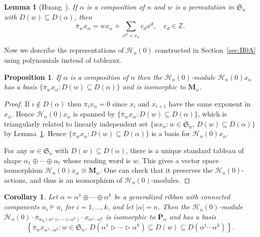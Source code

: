 \documentclass{amsart}
\newtheorem{lemma}[theorem]{Lemma}
\newtheorem{proposition}[theorem]{Proposition}
\newtheorem{corollary}[theorem]{Corollary}
\newtheorem*{Young's Rule}{Young's Rule}
\theoremstyle{definition}
\theoremstyle{remark}
\numberwithin{equation}{section}
\begin{document}
\begin{lemma}[Huang~\cite{H0CF}]\label{DemazureAtoms}
If $\alpha$ is a composition of $n$ and $w$ is a permutation in ${{\mathfrak S}}_n$ with $D(w)\subseteq D(\alpha)$, then
\[
\overline\pi_w x_{\alpha} =w x_{\alpha} +\sum_{x^d\prec x_{\alpha}}c_dx^d, \quad c_d\in{{\mathbb Z}}.
\]
\end{lemma}

Now we describe the representations of ${\mathcal{H}}_n(0)$ constructed in Section~\ref{sec:H0A} using polynomials instead of tableaux.

\begin{proposition}\label{prop:PolyM}
If $\alpha$ is a composition of $n$ then the ${\mathcal{H}}_n(0)$-module ${\mathcal{H}}_n(0) x_\alpha$ has a basis $\{ {\overline{\pi}}_w x_\alpha: D(w)\subseteq D(\alpha)\}$ and is isomorphic to ${\mathbf{M}}_\alpha$.
\end{proposition}

\begin{proof}
If $i\notin D(\alpha)$ then ${\overline{\pi}}_i x_\alpha=0$ since $x_i$ and $x_{i+1}$ have the same exponent in $x_\alpha$. Hence ${\mathcal{H}}_n(0) x_\alpha$ is spanned by $\{{\overline{\pi}}_w x_\alpha: D(w)\subseteq D(\alpha)\}$, which is triangularly related to linearly independent set $\{wx_\alpha: w\in{{\mathfrak S}}_n,\ D(w)\subseteq D(\alpha)\}$ by Lemma~\ref{DemazureAtoms}. Hence $\{{\overline{\pi}}_w x_\alpha: D(w)\subseteq D(\alpha)\}$ is a basis for ${\mathcal{H}}_n(0)x_\alpha$.

For any $w\in {{\mathfrak S}}_n$ with $D(w)\subseteq D(\alpha)$, there is a unique standard tableau of shape $\alpha_1\oplus\cdots\oplus\alpha_\ell$ whose reading word is $w$. This gives a vector space isomorphism ${\mathcal{H}}_n(0)x_\alpha \cong {\mathbf{M}}_\alpha$. One can check that it preserves the ${\mathcal{H}}_n(0)$-actions, and thus is an isomorphism of ${\mathcal{H}}_n(0)$-modules.
\end{proof}

\begin{corollary}
Let $\alpha=\alpha^1\oplus\cdots\oplus\alpha^k$ be a generalized ribbon with connected components $\alpha_i\models n_i$ for $i=1,\ldots,k$, and let $|\alpha| = n$. Then the ${\mathcal{H}}_n(0)$-module ${\mathcal{H}}_n(0)\cdot {\overline{\pi}}_{w_0(\alpha^1\rhd\cdots\rhd\alpha^k)} \cdot x_{\alpha^1\cdots\alpha^k}$ is isomorphic to ${\mathbf{P}}_\alpha$ and has a basis
\[
\left\{ {\overline{\pi}}_w x_{\alpha^1\cdots\alpha^k} : w\in{{\mathfrak S}}_n,\ D(\alpha^1\rhd\cdots\rhd\alpha^k) \subseteq D(w) \subseteq D(\alpha^1\cdots\alpha^k) \right\}.
\] 
\end{corollary}
\end{document}
